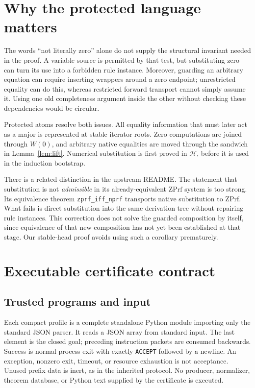 \documentclass[11pt,letterpaper]{article}
\theoremstyle{definition}\newtheorem{definition}[theorem]{Definition}
\theoremstyle{remark}\newtheorem{remark}[theorem]{Remark}
\newcommand{\Hcal}{\mathcal H}\newcommand{\Kcal}{\mathcal K}
\newcommand{\file}[1]{{\urlstyle{tt}\nolinkurl{#1}}}
\begin{document}
\section{Why the protected language matters}

The words ``not literally zero'' alone do not supply the structural
invariant needed in the proof. A variable source is permitted by that
test, but substituting zero can turn its use into a forbidden rule
instance. Moreover, guarding an arbitrary equation can require
inserting wrappers around a zero endpoint; unrestricted equality can
do this, whereas restricted forward transport cannot simply assume it.
Using one old completeness argument inside the other without checking
these dependencies would be circular.

Protected atoms resolve both issues. All equality information that
must later act as a major is represented at stable iterator roots.
Zero computations are joined through \(W(0)\), and arbitrary native
equalities are moved through the sandwich in
Lemma~\ref{lem:lift}. Numerical substitution is first proved in
\(\Hcal\), before it is used in the induction bootstrap.

There is a related distinction in the upstream README. The statement
that substitution is not \emph{admissible} in its already-equivalent
\(\mathrm{ZPrf}\) system is too strong. Its equivalence theorem
\file{zprf_iff_nprf} transports native substitution to ZPrf. What
fails is direct substitution into the same derivation tree without
repairing rule instances. This correction does not solve the guarded
composition by itself, since equivalence of that new composition has
not yet been established at that stage. Our stable-head proof avoids
using such a corollary prematurely.

\section{Executable certificate contract}\label{sec:checker}

\subsection{Trusted programs and input}

Each compact profile is a complete standalone Python module importing
only the standard JSON parser. It reads a JSON array from standard
input. The last element is the closed goal; preceding instruction
packets are consumed backwards. Success is normal process exit with
exactly \file{ACCEPT} followed by a newline. An exception, nonzero
exit, timeout, or resource exhaustion is not acceptance. Unused prefix
data is inert, as in the inherited protocol. No producer, normalizer,
theorem database, or Python text supplied by the certificate is executed.
\end{document}
